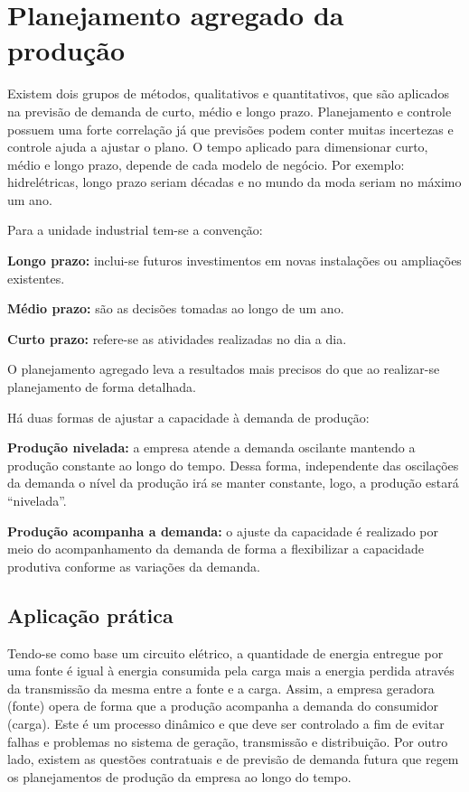 \chapter{Planejamento agregado da produção}
\label{chap:planejamento_agregado}

Existem dois grupos de métodos, qualitativos e quantitativos, que são aplicados na previsão de demanda de curto, médio e longo prazo.
Planejamento e controle possuem uma forte correlação já que previsões podem conter muitas incertezas e controle ajuda a ajustar o plano.
O tempo aplicado para dimensionar curto, médio e longo prazo, depende de cada modelo de negócio. Por exemplo: hidrelétricas, longo prazo seriam décadas e no mundo da moda seriam no máximo um ano.

Para a unidade industrial tem-se a convenção:

\textbf{Longo prazo:} inclui-se futuros investimentos em novas instalações ou ampliações existentes.

\textbf{Médio prazo:} são as decisões tomadas ao longo de um ano.

\textbf{Curto prazo:} refere-se as atividades realizadas no dia a dia.

O planejamento agregado leva a resultados mais precisos do que ao realizar-se planejamento de forma detalhada.

Há duas formas de ajustar a capacidade à demanda de produção:

\textbf{Produção nivelada:} a empresa atende a demanda oscilante mantendo a produção constante ao longo do tempo. Dessa forma, independente das oscilações da demanda o nível da produção irá se manter constante, logo, a produção estará ``nivelada''.

\textbf{Produção acompanha a demanda:} o ajuste da capacidade é realizado por meio do acompanhamento da demanda de forma a flexibilizar a capacidade produtiva conforme as variações da demanda.


\section{Aplicação prática}
\label{sec:planejamento_agregado_aplicacao}

Tendo-se como base um circuito elétrico, a quantidade de energia entregue por uma fonte é igual à energia consumida pela carga mais a energia perdida através da transmissão da mesma entre a fonte e a carga. Assim, a empresa geradora (fonte) opera de forma que a produção acompanha a demanda do consumidor (carga). Este é um processo dinâmico e que deve ser controlado a fim de evitar falhas e problemas no sistema de geração, transmissão e distribuição. Por outro lado, existem as questões contratuais e de previsão de demanda futura que regem os planejamentos de produção da empresa ao longo do tempo.

